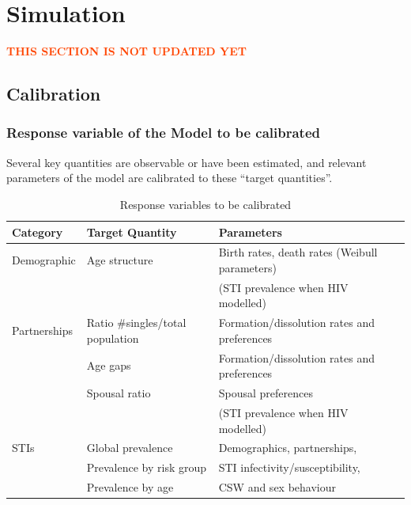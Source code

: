 \documentclass[11pt, onecolumn]{article}
\newcommand{\warning}[1]{\textbf{\textcolor{OrangeRed}{#1}}}
\begin{document}

\section{Simulation}

\warning{THIS SECTION IS NOT UPDATED YET}

\subsection{Calibration}

\subsubsection{Response variable of the Model to be calibrated}

Several key quantities are observable or have been estimated, and relevant parameters of the model are calibrated to these ``target quantities''.
\begin{table}[htdp]
\caption{Response variables to be calibrated}
\begin{center}
\begin{tabular}{lll}

\hline
\textbf{Category} & \textbf{Target Quantity} & \textbf{Parameters} \\

\hline
Demographic  &  Age structure & Birth rates, death rates (Weibull parameters)\\
 & & (STI prevalence when HIV modelled)\\
\hline
Partnerships  &  Ratio \#singles/total population  &  Formation/dissolution rates and preferences \\
  &  Age gaps &   Formation/dissolution rates and preferences  \\
  &  Spousal ratio & Spousal preferences \\
 & & (STI prevalence when HIV modelled)\\
\hline
STIs	& Global prevalence & Demographics, partnerships,\\
	& Prevalence by risk group & STI infectivity/susceptibility,\\
	& Prevalence by age & CSW and sex behaviour\\
\hline
\end{tabular}
\end{center}
\label{default}
\end{table}
\end{document}
